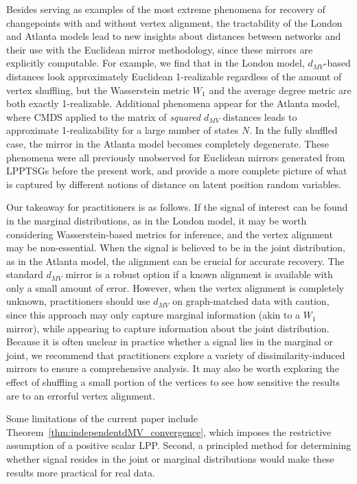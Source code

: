 \documentclass[12pt]{article}
\theoremstyle{definition}
\begin{document}
Besides serving as examples of the most extreme phenomena for recovery of changepoints with and without vertex alignment, the tractability of the London and Atlanta models lead to new insights about distances between networks and their use with the Euclidean mirror methodology, since these mirrors are explicitly computable. For example, we find that in the London model, $d_{MV}$-based distances look approximately Euclidean 1-realizable regardless of the amount of vertex shuffling, but the Wasserstein metric $W_1$ and the average degree metric are both exactly 1-realizable. Additional phenomena appear for the Atlanta model, where CMDS applied to the matrix of \emph{squared} $d_{MV}$ distances leads to approximate 1-realizability for a large number of states $N$. In the fully shuffled case, the mirror in the Atlanta model becomes completely degenerate. These phenomena were all previously unobserved for Euclidean mirrors generated from LPPTSGs before the present work, and provide a more complete picture of what is captured by different notions of distance on latent position random variables. 


Our takeaway for practitioners is as follows.
If the signal of interest can be found in the marginal distributions, as in the London model, it may be worth considering Wasserstein-based metrics for inference, and the vertex alignment may be non-essential. When the signal is believed to be in the joint distribution, as in the Atlanta model, the alignment can be crucial for accurate recovery. 
The standard $d_{MV}$ mirror is a robust option if a known alignment is available with only a small amount of error.
However, when the vertex alignment is completely unknown, practitioners should use $d_{MV}$ on graph-matched data with caution, since this approach may only capture marginal information (akin to a $W_1$ mirror), while appearing to capture information about the joint distribution. Because it is often unclear in practice whether a signal lies in the marginal or joint, we recommend that practitioners explore a variety of dissimilarity-induced mirrors to ensure a comprehensive analysis. It may also be worth exploring the effect of shuffling a small portion of the vertices to see how sensitive the results are to an errorful vertex alignment.

Some limitations of the current paper include Theorem~\ref{thm:independentdMV_convergence}, which imposes the restrictive assumption of a positive scalar LPP. Second, a principled method for determining whether signal resides in the joint or marginal distributions would make these results more practical for real data. 
\end{document}
